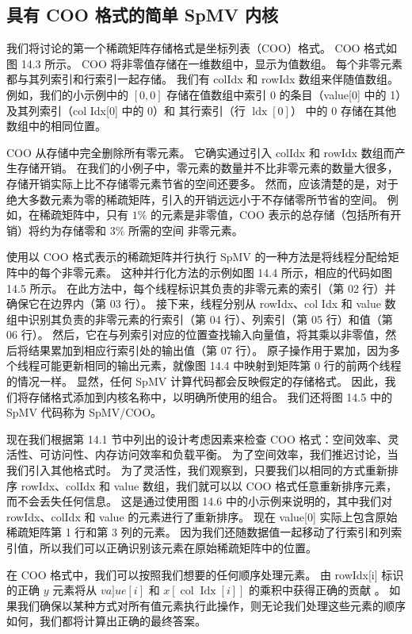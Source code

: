 \subsection{具有 COO 格式的简单 SpMV 内核}
我们将讨论的第一个稀疏矩阵存储格式是坐标列表（COO）格式。 COO 格式如图 14.3 所示。 COO 将非零值存储在一维数组中，显示为值数组。 每个非零元素都与其列索引和行索引一起存储。 我们有 colIdx 和 rowIdx 数组来伴随值数组。 例如，我们的小示例中的 $[0,0]$ 存储在值数组中索引 0 的条目（value[0] 中的 1）及其列索引（col Idx[0] 中的 0）和 其行索引（行 $\operatorname{ldx}[0]）$ 中的 0 存储在其他数组中的相同位置。

COO 从存储中完全删除所有零元素。 它确实通过引入 colIdx 和 rowIdx 数组而产生存储开销。 在我们的小例子中，零元素的数量并不比非零元素的数量大很多，存储开销实际上比不存储零元素节省的空间还要多。 然而，应该清楚的是，对于绝大多数元素为零的稀疏矩阵，引入的开销远远小于不存储零所节省的空间。 例如，在稀疏矩阵中，只有 $1 \%$ 的元素是非零值，COO 表示的总存储（包括所有开销）将约为存储零和 $3 \%$ 所需的空间 非零元素。

使用以 COO 格式表示的稀疏矩阵并行执行 SpMV 的一种方法是将线程分配给矩阵中的每个非零元素。 这种并行化方法的示例如图 14.4 所示，相应的代码如图 14.5 所示。 在此方法中，每个线程标识其负责的非零元素的索引（第 02 行）并确保它在边界内（第 03 行）。 接下来，线程分别从 rowIdx、col Idx 和 value 数组中识别其负责的非零元素的行索引（第 04 行）、列索引（第 05 行）和值（第 06 行）。 然后，它在与列索引对应的位置查找输入向量值，将其乘以非零值，然后将结果累加到相应行索引处的输出值（第 07 行）。 原子操作用于累加，因为多个线程可能更新相同的输出元素，就像图 14.4 中映射到矩阵第 0 行的前两个线程的情况一样。 显然，任何 SpMV 计算代码都会反映假定的存储格式。 因此，我们将存储格式添加到内核名称中，以明确所使用的组合。 我们还将图 14.5 中的 SpMV 代码称为 SpMV/COO。

现在我们根据第 14.1 节中列出的设计考虑因素来检查 $\mathrm{COO}$ 格式：空间效率、灵活性、可访问性、内存访问效率和负载平衡。 为了空间效率，我们推迟讨论，当我们引入其他格式时。 为了灵活性，我们观察到，只要我们以相同的方式重新排序 rowIdx、colIdx 和 value 数组，我们就可以以 $\mathrm{COO}$ 格式任意重新排序元素，而不会丢失任何信息。 这是通过使用图 14.6 中的小示例来说明的，其中我们对 rowIdx、colIdx 和 value 的元素进行了重新排序。 现在 value[0] 实际上包含原始稀疏矩阵第 1 行和第 3 列的元素。 因为我们还随数据值一起移动了行索引和列索引值，所以我们可以正确识别该元素在原始稀疏矩阵中的位置。

在 COO 格式中，我们可以按照我们想要的任何顺序处理元素。 由 rowIdx[i] 标识的正确 $y$ 元素将从 $v a] u e[i]$ 和 $x[\operatorname{col} \operatorname{Idx}[i]]$ 的乘积中获得正确的贡献 。 如果我们确保以某种方式对所有值元素执行此操作，则无论我们处理这些元素的顺序如何，我们都将计算出正确的最终答案。

